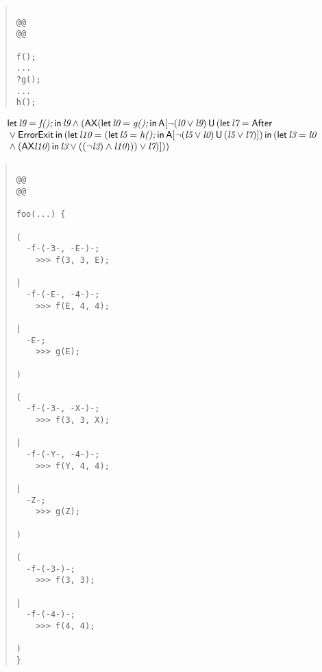 \documentclass{article}
\newcommand{\U}{\,\mbox{\sf{U}}\,}
\newcommand{\A}{\mbox{\sf{A}}}
\newcommand{\AX}{\mbox{\sf{AX}}}
\newcommand{\mita}[1]{\mbox{\it{{#1}}}}
\newcommand{\msf}[1]{\mbox{\sf{{#1}}}}
\begin{document}
\begin{quote}\begin{verbatim}

@@
@@

f();
...
?g();
...
h();
\end{verbatim}\end{quote}

\[\begin{array}{l}
\mita{\sf{let}} \, \mita{l9} = \mita{f();} \, \mita{\sf{in}} \, \mita{l9} \wedge (\AX(\mita{\sf{let}} \, \mita{l0} = \mita{g();} \, \mita{\sf{in}} \, \A[\neg (\mita{l0} \vee \mita{l9}) \U (\mita{\sf{let}} \, \mita{l7} = \msf{After}\\\mbox{} \vee \msf{ErrorExit} \, \mita{\sf{in}} \, (\mita{\sf{let}} \, \mita{l10} = (\mita{\sf{let}} \, \mita{l5} = \mita{h();} \, \mita{\sf{in}} \, \A[\neg (\mita{l5} \vee \mita{l0}) \U (\mita{l5} \vee \mita{l7})]

) \, \mita{\sf{in}} \, (\mita{\sf{let}} \, \mita{l3} = \mita{l0}\\\mbox{} \wedge (\AX\mita{l10}) \, \mita{\sf{in}} \, \mita{l3} \vee ((\neg \mita{l3}) \wedge \mita{l10})
)
) \vee \mita{l7}
)]

))

\end{array}\]

\begin{quote}\begin{verbatim}

@@
@@

foo(...) {
  
(
  -f-(-3-, -E-)-;
    >>> f(3, 3, E);
  
|
  -f-(-E-, -4-)-;
    >>> f(E, 4, 4);
  
|
  -E-;
    >>> g(E);
  
)
  
(
  -f-(-3-, -X-)-;
    >>> f(3, 3, X);
  
|
  -f-(-Y-, -4-)-;
    >>> f(Y, 4, 4);
  
|
  -Z-;
    >>> g(Z);
  
)
  
(
  -f-(-3-)-;
    >>> f(3, 3);
  
|
  -f-(-4-)-;
    >>> f(4, 4);
  
)
}
\end{verbatim}\end{quote}
\end{document}
